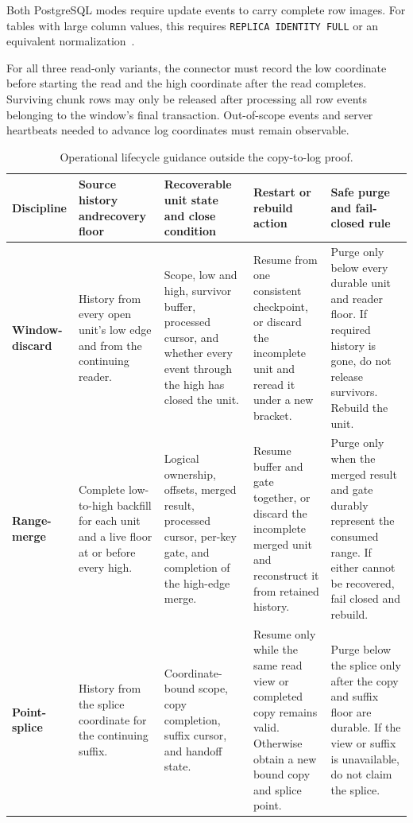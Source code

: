 \documentclass[sigconf,nonacm,10pt]{acmart}
\theoremstyle{plain}
\theoremstyle{definition}
\begin{document}
Both PostgreSQL modes require update events to carry complete row
images. For tables with large column values, this requires
\texttt{REPLICA IDENTITY FULL} or an equivalent
normalization~\cite{debezium_postgresql_connector}.

For all three read-only variants, the connector must record the low coordinate
before starting the read and the high coordinate after the read completes.
Surviving chunk rows may only be released after processing all row events
belonging to the window's final transaction. Out-of-scope events and
server heartbeats needed to advance log coordinates must remain observable.

\begin{table}[t]
\caption{Operational lifecycle guidance outside the copy-to-log proof.}
\label{tab:lifecycle}
\footnotesize
\setlength{\tabcolsep}{2.6pt}
\renewcommand{\arraystretch}{1.08}
\begin{tabular}{@{}>{\RaggedRight\hyphenpenalty=10000\exhyphenpenalty=10000\arraybackslash}p{2.2cm}
                    >{\RaggedRight\arraybackslash}p{3.15cm}
                    >{\RaggedRight\arraybackslash}p{4.1cm}
                    >{\RaggedRight\arraybackslash}p{3.45cm}
                    >{\RaggedRight\arraybackslash}p{4.05cm}@{}}
\toprule
Discipline & Source history and\newline recovery floor & Recoverable unit state and close condition & Restart or rebuild action & Safe purge and fail-closed rule \\
\midrule
\textbf{Window-discard} &
History from every open unit's low edge and from the continuing reader. &
Scope, low and high, survivor buffer, processed cursor, and whether every
event through the high has closed the unit. &
Resume from one consistent checkpoint, or discard the incomplete unit
and reread it under a new bracket. &
Purge only below every durable unit and reader floor. If required
history is gone, do not release survivors. Rebuild the unit. \\
\addlinespace
\textbf{Range-merge} &
Complete low-to-high backfill for each unit and a live floor at or
before every high. &
Logical ownership, offsets, merged result, processed cursor, per-key
gate, and completion of the high-edge merge. &
Resume buffer and gate together, or discard the incomplete merged unit
and reconstruct it from retained history. &
Purge only when the merged result and gate durably represent the
consumed range. If either cannot be recovered, fail closed and rebuild. \\
\addlinespace
\textbf{Point-splice} &
History from the splice coordinate for the continuing suffix. &
Coordinate-bound scope, copy completion, suffix cursor, and handoff
state. &
Resume only while the same read view or completed copy remains valid.
Otherwise obtain a new bound copy and splice point. &
Purge below the splice only after the copy and suffix floor are durable.
If the view or suffix is unavailable, do not claim the splice. \\
\bottomrule
\end{tabular}
\end{table}
\end{document}
